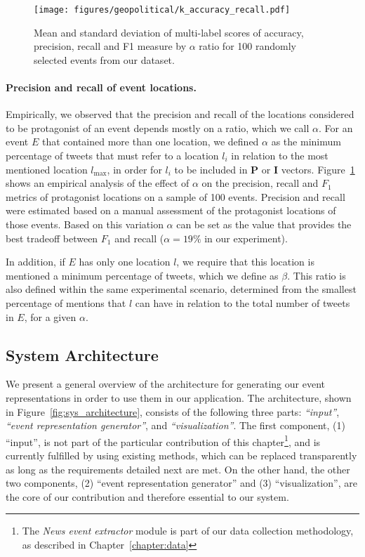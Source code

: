 \begin{figure}[h]
  \centering
  \texttt{[image: figures/geopolitical/k\_accuracy\_recall.pdf]}
  \caption{Mean and standard deviation of multi-label scores of accuracy,
  precision, recall and F1 measure by $\alpha$ ratio for 100 randomly selected
  events from our dataset.}
  \label{fig:eval}
\end{figure}

\medskip
\paragraph{Precision and recall of event locations.}
%
Empirically, we observed that the precision and recall of the locations
considered to be protagonist of an event depends mostly on a ratio, which we
call $\alpha$.
%
For an event $E$ that contained more than one location, we defined $\alpha$ as
the minimum percentage of tweets that must refer to a location $l_i$ in relation
to the most mentioned location $l_{\mathrm{max}}$, in order for $l_i$ to be
included in $\mathbf{P}$ or $\mathbf{I}$ vectors.
%
Figure~\ref{fig:eval} shows an empirical analysis of the effect of $\alpha$ on
the precision, recall and $F_1$ metrics of protagonist locations on a sample of
100 events.  
%
Precision and recall were estimated based on a manual assessment of the
protagonist locations of those events. 
%
Based on this variation $\alpha$ can be set as the value that provides the best
tradeoff between $F_1$ and recall ($\alpha = 19\%$ in our experiment).

In addition, if $E$ has only one location $l$, we require that this location is
mentioned a minimum percentage of tweets, which we define as $\beta$. This ratio
is also defined within the same experimental scenario, determined from the
smallest percentage of mentions that $l$ can have in relation to the total
number of tweets in $E$, for a given $\alpha$.



\subsection{System Architecture}\label{sec:framework}

We present a general overview of the architecture for generating our event
representations in order to use them in our application.  
%
The architecture, shown in Figure~\ref{fig:sys_architecture}, consists of the
following three parts: {\em ``input''}, {\em ``event representation
generator''}, and {\em ``visualization''}.  
%
The first component, (1) ``input'', is not part of the particular contribution
of this chapter\footnote{The {\it News event extractor} module is part of our
data collection methodology, as described in Chapter~\ref{chapter:data}}, and is
currently fulfilled by using existing methods, which can be replaced
transparently as long as the requirements detailed next are met. 
%
On the other hand, the other two components, (2) ``event representation
generator'' and (3) ``visualization'', are the core of our contribution and
therefore essential to our system.


